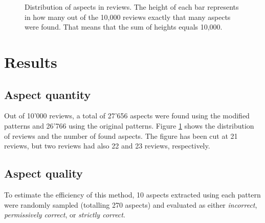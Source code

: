 \documentclass[a4paper,11pt]{kth-mag}
\begin{document}
\begin{figure}
  \centering
  \caption{Distribution of aspects in reviews.
    The height of each bar represents in how many out of the 10,000 reviews exactly that many aspects were found.
    That means that the sum of heights equals 10,000.
  }
  \label{fig:extr_count}
\end{figure}

\clearpage

\section{Results}

\subsection{Aspect quantity}
Out of 10'000 reviews, a total of 27'656 aspects were found using the modified patterns
and 26'766 using the original patterns.
Figure \ref{fig:extr_count} shows the distribution of reviews and the number of
found aspects. The figure has been cut at 21 reviews, but two reviews had also 22 and 23 reviews, respectively.


\subsection{Aspect quality}
To estimate the efficiency of this method, 10 aspects extracted using each pattern were randomly sampled
(totalling 270 aspects) and evaluated as either \emph{incorrect}, \emph{permissively correct},
or \emph{strictly correct}.
\end{document}
